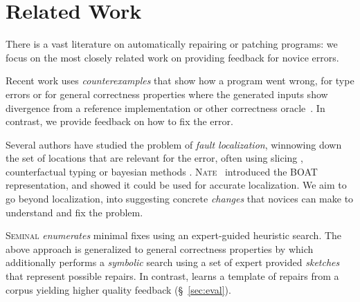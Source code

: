\section{Related Work}
\label{sec:related-work}

There is a vast literature on automatically repairing or patching programs:
we focus on the most closely related work on providing feedback for novice errors.

%
Recent work uses \emph{counterexamples} that show how 
a program went wrong, for type errors \cite{Seidel2016-ul} 
or for general correctness properties where the generated 
inputs show divergence from a reference implementation or 
other correctness oracle~\cite{Song_2019}. 
In contrast, we provide feedback on how to fix the error.

 Several authors have studied the problem of
\emph{fault localization}, \ie winnowing down the set of locations that are
relevant for the error, often using slicing
\citep{Wand1986-nw,Haack2003-vc,Tip2001-qp,Rahli2015-tt}, counterfactual typing
\citep{Chen2014-gd} or bayesian methods \citep{Zhang2014-lv}.
%
\textsc{Nate}~\citep{Seidel:2017} introduced the BOAT representation,
and showed it could be used for accurate localization.
%
We aim to go beyond localization, into suggesting concrete \emph{changes} that
novices can make to understand and fix the problem.

%
\textsc{Seminal} \citep{Lerner2007-dt} \emph{enumerates} minimal fixes using an
expert-guided heuristic search.
%
The above approach is generalized to general correctness properties by
\cite{singh2013} which additionally performs a \emph{symbolic} search using a
set of expert provided \emph{sketches} that represent possible repairs.
%
In contrast, \toolname learns a template of repairs from a corpus yielding
higher quality feedback (\S~\ref{sec:eval}).


